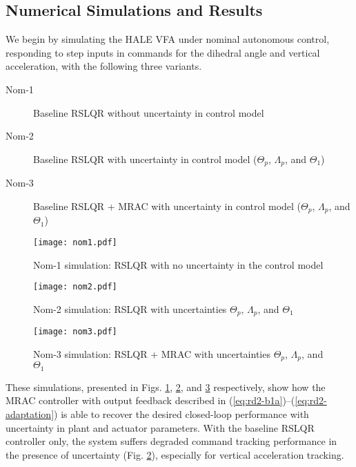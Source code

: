 \subsection{Numerical Simulations and Results} \label{subsec:sims}
We begin by simulating the HALE VFA under nominal autonomous control, responding to step inputs in commands for the dihedral angle and vertical acceleration, with the following three variants.
\begin{description}
	\item[Nom-1] Baseline RSLQR without uncertainty in control model
	\item[Nom-2] Baseline RSLQR with uncertainty in control model ($\Theta_p$, $\Lambda_p$, and $\Theta_1$)
	\item[Nom-3] Baseline RSLQR + MRAC with uncertainty in control model ($\Theta_p$, $\Lambda_p$, and $\Theta_1$)
\end{description}

\begin{figure}[htbp]
	\centering
	\texttt{[image: nom1.pdf]}
	\caption{Nom-1 simulation: RSLQR with no uncertainty in the control model}
	\label{fig:nom1}
\end{figure}

\begin{figure}[htbp]
	\centering
	\texttt{[image: nom2.pdf]}
	\caption{Nom-2 simulation: RSLQR with uncertainties $\Theta_p$, $\Lambda_p$, and $\Theta_1$}
	\label{fig:nom2}
\end{figure}

\begin{figure}[htbp]
	\centering
	\texttt{[image: nom3.pdf]}
	\caption{Nom-3 simulation: RSLQR + MRAC with uncertainties $\Theta_p$, $\Lambda_p$, and $\Theta_1$}
	\label{fig:nom3}
\end{figure}

These simulations, presented in Figs. \ref{fig:nom1}, \ref{fig:nom2}, and \ref{fig:nom3} respectively, show how the MRAC controller with output feedback described in (\ref{eq:rd2-b1a})--(\ref{eq:rd2-adaptation}) is able to recover the desired closed-loop performance with uncertainty in plant and actuator parameters. With the baseline RSLQR controller only, the system suffers degraded command tracking performance in the presence of uncertainty (Fig. \ref{fig:nom2}), especially for vertical acceleration tracking.

